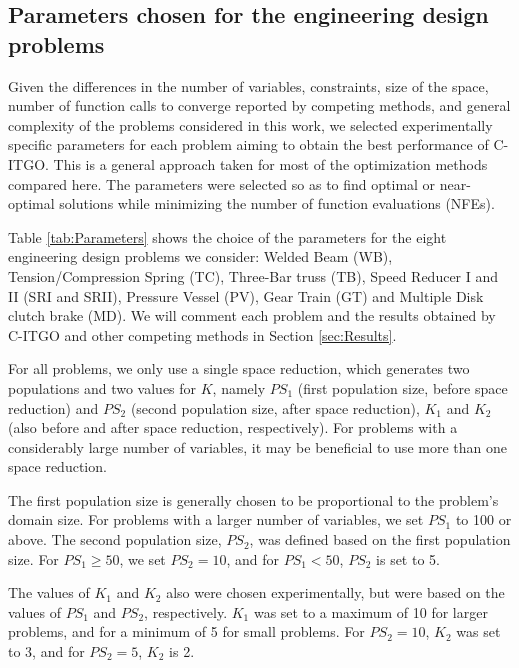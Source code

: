 \subsection{Parameters chosen for the engineering design problems}

Given the differences in the number of variables, constraints, size of the space, number of function calls to converge reported by competing methods, and general complexity of the problems considered in this work, we selected experimentally specific parameters for each problem aiming to obtain the best performance of C-ITGO. This is a general approach taken for most of the optimization methods compared here. The parameters were selected so as to find optimal or near-optimal solutions while minimizing the number of function evaluations (NFEs).

Table \ref{tab:Parameters} shows the choice of the parameters for the eight engineering design problems we consider: Welded Beam (WB), Tension/Compression Spring (TC), Three-Bar truss (TB), Speed Reducer I and II (SRI and SRII), Pressure Vessel (PV), Gear Train (GT) and Multiple Disk clutch brake (MD). We will comment each problem and the results obtained by C-ITGO and other competing methods in Section \ref{sec:Results}.





For all problems, we only use a single space reduction, which generates two populations and two values for $K$, namely $PS_1$ (first population size, before space reduction) and $PS_2$ (second population size, after space reduction), $K_1$ and $K_2$ (also before and after space reduction, respectively). For problems with a considerably large number of variables, it may be beneficial to use more than one space reduction.

The first population size is generally chosen to be proportional to the problem's domain size. For problems with a larger number of variables, we set $PS_1$ to 100 or above. The second population size, $PS_2$, was defined based on the first population size. For $PS_1 \geq 50$, we set $PS_2 = 10$, and for $PS_1 < 50$, $PS_2$ is set to 5.

The values of $K_1$ and $K_2$ also were chosen experimentally, but were based on the values of $PS_1$ and $PS_2$, respectively. $K_1$ was set to a maximum of 10 for larger problems, and for a minimum of 5 for small problems. For $PS_2 = 10$, $K_2$ was set to 3, and for $PS_2 = 5$, $K_2$ is 2.

